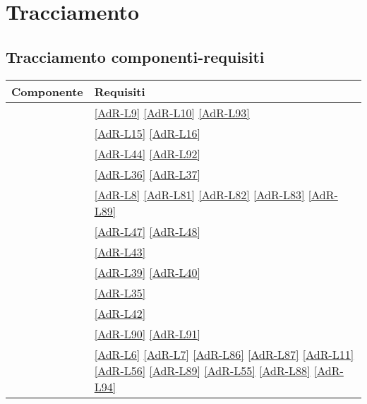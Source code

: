 \section{Tracciamento}
\subsection{Tracciamento componenti-requisiti}
\begin{longtable}{|>{\centering}P{7cm}|>{\centering}P{5cm}|}
	\hline \textbf{Componente} & \textbf{Requisiti} \tabularnewline 
	\endfirsthead
	\hline {} & \ref{AdR-L9} \linebreak \ref{AdR-L10} \linebreak \ref{AdR-L93} \tabularnewline
	\hline {} & \ref{AdR-L15} \linebreak \ref{AdR-L16} \tabularnewline
	\hline {} & \ref{AdR-L44} \linebreak \ref{AdR-L92} \tabularnewline
	\hline {} & \ref{AdR-L36} \linebreak \ref{AdR-L37} \tabularnewline
	\hline {} & \ref{AdR-L8} \linebreak \ref{AdR-L81} \linebreak \ref{AdR-L82} \linebreak \ref{AdR-L83} \linebreak \ref{AdR-L89} \tabularnewline
	\hline {} & \ref{AdR-L47} \linebreak \ref{AdR-L48} \tabularnewline
	\hline {} & \ref{AdR-L43} \tabularnewline
	\hline {} & \ref{AdR-L39} \linebreak \ref{AdR-L40} \tabularnewline
	\hline {} & \ref{AdR-L35} \tabularnewline
	\hline {} & \ref{AdR-L42} \tabularnewline
	\hline {} & \ref{AdR-L90} \linebreak \ref{AdR-L91} \tabularnewline
	\hline {} & \ref{AdR-L6} \linebreak \ref{AdR-L7} \linebreak \ref{AdR-L86} \linebreak \ref{AdR-L87} \linebreak \ref{AdR-L11} \linebreak \ref{AdR-L56} \linebreak \ref{AdR-L89} \linebreak \ref{AdR-L55} \linebreak \ref{AdR-L88} \linebreak \ref{AdR-L94} \tabularnewline

\end{longtable}
